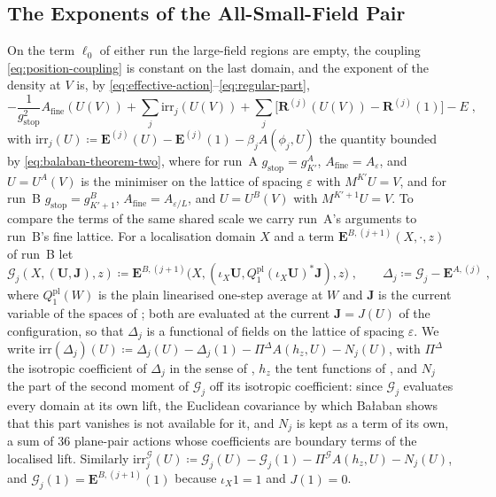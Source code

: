 \documentclass[11pt]{preprint}
\numberwithin{equation}{section}
\theoremstyle{definition}
\theoremstyle{remark}
\theoremstyle{plain}
\begin{document}
\subsection{The Exponents of the All-Small-Field Pair}\label{sec:exponent-difference}

On the term $\ell_0$ of either run the large-field regions are empty, the coupling \eqref{eq:position-coupling} is constant on the last domain, and the exponent of the density at $V$ is, by \eqref{eq:effective-action}--\eqref{eq:regular-part},
\begin{equation}\label{eq:trivial-exponent}
    -\frac{1}{g_{\mathrm{stop}}^2}A_{\mathrm{fine}}(U(V)) + \sum_j\mathrm{irr}_j(U(V)) + \sum_j\bigl[\mathbf R^{(j)}(U(V)) - \mathbf R^{(j)}(1)\bigr] - E\;,
\end{equation}
with $\mathrm{irr}_j(U) \coloneqq \mathbf E^{(j)}(U) - \mathbf E^{(j)}(1) - \beta_jA(\phi_j, U)$ the quantity bounded by \eqref{eq:balaban-theorem-two}, where for run~A $g_{\mathrm{stop}} = g^A_{K'}$, $A_{\mathrm{fine}} = A_\varepsilon$, and $U = U^A(V)$ is the minimiser on the lattice of spacing $\varepsilon$ with $M^{K'}U = V$, and for run~B $g_{\mathrm{stop}} = g^B_{K'+1}$, $A_{\mathrm{fine}} = A_{\varepsilon/L}$, and $U = U^B(V)$ with $M^{K'+1}U = V$. To compare the terms of the same shared scale we carry run~A's arguments to run~B's fine lattice. For a localisation domain $X$ and a term $\mathbf E^{B,(j+1)}(X, \cdot, z)$ of run~B let
\begin{equation}\label{eq:lifted-term}
    \mathcal G_j(X, (\mathbf U, \mathbf J), z) \coloneqq \mathbf E^{B,(j+1)}\bigl(X, (\iota_X\mathbf U, Q^{\mathrm{pl}}_1(\iota_X\mathbf U)^*\mathbf J), z\bigr)\;,
    \qquad
    \Delta_j \coloneqq \mathcal G_j - \mathbf E^{A,(j)}\;,
\end{equation}
where $Q^{\mathrm{pl}}_1(W)$ is the plain linearised one-step average at $W$ and $\mathbf J$ is the current variable of the spaces of \cite[(1.10)--(1.16), p.~262]{BalabanRG1}; both are evaluated at the current $\mathbf J = J(U)$ of the configuration, so that $\Delta_j$ is a functional of fields on the lattice of spacing $\varepsilon$. We write $\mathrm{irr}(\Delta_j)(U) \coloneqq \Delta_j(U) - \Delta_j(1) - \Pi^\Delta A(h_z, U) - N_j(U)$, with $\Pi^\Delta$ the isotropic coefficient of $\Delta_j$ in the sense of \cite[(3.57)--(3.61), pp.~281--282]{BalabanCRE}, $h_z$ the tent functions of \cite[(3.65), p.~283]{BalabanCRE}, and $N_j$ the part of the second moment of $\mathcal G_j$ off its isotropic coefficient: since $\mathcal G_j$ evaluates every domain at its own lift, the Euclidean covariance by which Ba{\l}aban shows that this part vanishes \cite[(3.60)--(3.61), p.~282]{BalabanCRE} is not available for it, and $N_j$ is kept as a term of its own, a sum of $36$ plane-pair actions whose coefficients are boundary terms of the localised lift. Similarly $\mathrm{irr}^{\mathcal G}_j(U) \coloneqq \mathcal G_j(U) - \mathcal G_j(1) - \Pi^{\mathcal G}A(h_z, U) - N_j(U)$, and $\mathcal G_j(1) = \mathbf E^{B,(j+1)}(1)$ because $\iota_X1 = 1$ and $J(1) = 0$.
\end{document}

